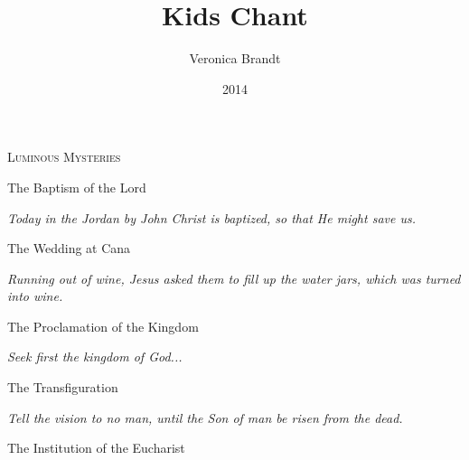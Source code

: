 \documentclass[a5paper, 12pt]{memoir}
\title{Kids Chant}
\author{Veronica Brandt}
\date{2014}
\renewcommand\Rbar{\makebox[1em][l]{\versicles r}}
\begin{document}
\setlength{\parindent}{0mm}

\pagestyle{kidschant}

\setcounter{secnumdepth}{0}

\begin{center}
\textsc{Luminous Mysteries}
\end{center}

The Baptism of the Lord


\bigskip

\emph{Today in the Jordan by John Christ is baptized, so that He might save us.}

\bigskip


The Wedding at Cana




\bigskip

\emph{Running out of wine, Jesus asked them to fill up the water jars, which was turned into wine.}

\newpage

The Proclamation of the Kingdom


\bigskip

\emph{Seek first the kingdom of God...}

\bigskip

The Transfiguration


\emph{Tell the vision to no man, until the Son of man be risen from the dead.}

\bigskip

The Institution of the Eucharist

\end{document}
